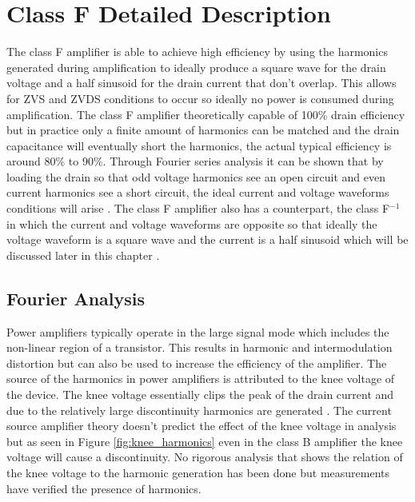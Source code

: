 ﻿\chapter{Class F Detailed Description }

The class F amplifier is able to achieve high efficiency by using the harmonics generated during amplification to ideally produce a square wave for the drain voltage and a half sinusoid for the drain current that don't overlap. This allows for ZVS and ZVDS conditions to occur so ideally no power is consumed during amplification. The class F amplifier theoretically capable of 100\% drain efficiency but in practice only a finite amount of harmonics can be matched and the drain capacitance will eventually short the harmonics, the actual typical efficiency is around 80\% to 90\%. Through Fourier series analysis it can be shown that by loading the drain so that odd voltage harmonics see an open circuit and even current harmonics see a short circuit, the ideal current and voltage waveforms conditions will arise \cite{Gao2006}. The class F amplifier also has a counterpart, the class F$^{-1}$ in which the current and voltage waveforms are opposite so that ideally the voltage waveform is a square wave and the current is a half sinusoid which will be discussed later in this chapter \cite{Moon2012}.

\section{Fourier Analysis}

Power amplifiers typically operate in the large signal mode which includes the non-linear region of a transistor. This results in harmonic and intermodulation distortion but can also be used to increase the efficiency of the amplifier. The source of the harmonics in power amplifiers is attributed to the knee voltage of the device. The knee voltage essentially clips the peak of the drain current and due to the relatively large discontinuity harmonics are generated \cite{Colantonio1998}. The current source amplifier theory doesn't predict the effect of the knee voltage in analysis but as seen in Figure \ref{fig:knee_harmonics} even in the class B amplifier the knee voltage will cause a discontinuity. No rigorous analysis that shows the relation of the knee voltage to the harmonic generation has been done but measurements have verified the presence of harmonics.

